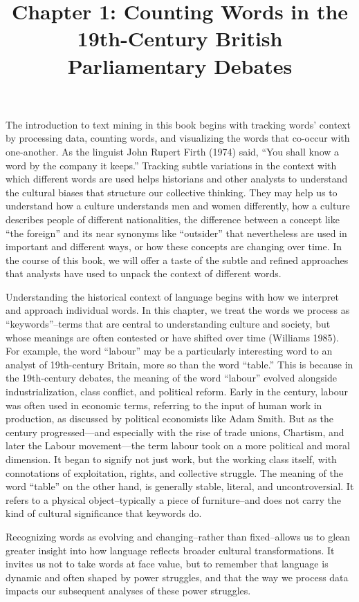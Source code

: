 \documentclass[
]{article}
\title{Chapter 1: Counting Words in the 19th-Century British
Parliamentary Debates}
\author{}
\date{\vspace{-2.5em}}
\begin{document}
\maketitle

The introduction to text mining in this book begins with tracking words'
context by processing data, counting words, and visualizing the words
that co-occur with one-another. As the linguist John Rupert Firth (1974)
said, ``You shall know a word by the company it keeps.'' Tracking subtle
variations in the context with which different words are used helps
historians and other analysts to understand the cultural biases that
structure our collective thinking. They may help us to understand how a
culture understands men and women differently, how a culture describes
people of different nationalities, the difference between a concept like
``the foreign'' and its near synonyms like ``outsider'' that
nevertheless are used in important and different ways, or how these
concepts are changing over time. In the course of this book, we will
offer a taste of the subtle and refined approaches that analysts have
used to unpack the context of different words.

Understanding the historical context of language begins with how we
interpret and approach individual words. In this chapter, we treat the
words we process as ``keywords''--terms that are central to
understanding culture and society, but whose meanings are often
contested or have shifted over time (Williams 1985). For example, the
word ``labour'' may be a particularly interesting word to an analyst of
19th-century Britain, more so than the word ``table.'' This is because
in the 19th-century debates, the meaning of the word ``labour'' evolved
alongside industrialization, class conflict, and political reform. Early
in the century, labour was often used in economic terms, referring to
the input of human work in production, as discussed by political
economists like Adam Smith. But as the century progressed---and
especially with the rise of trade unions, Chartism, and later the Labour
movement---the term labour took on a more political and moral dimension.
It began to signify not just work, but the working class itself, with
connotations of exploitation, rights, and collective struggle. The
meaning of the word ``table'' on the other hand, is generally stable,
literal, and uncontroversial. It refers to a physical object--typically
a piece of furniture--and does not carry the kind of cultural
significance that keywords do.

Recognizing words as evolving and changing--rather than fixed--allows us
to glean greater insight into how language reflects broader cultural
transformations. It invites us not to take words at face value, but to
remember that language is dynamic and often shaped by power struggles,
and that the way we process data impacts our subsequent analyses of
these power struggles.
\end{document}
